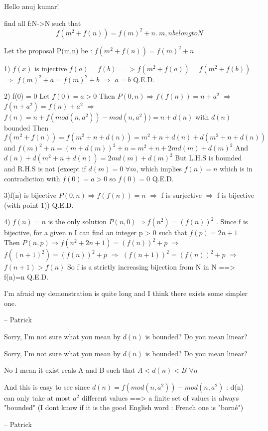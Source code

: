 \begin{mysolution}
	Hello anuj kumar!
\begin{tcolorbox}find all f:N->N such that
\[f(m^{2}+f(n))=f(m)^{2}+n.\ m,n belong to N \]
\end{tcolorbox}

Let the proposal P(m,n) be : $f(m^{2}+f(n))=f(m)^{2}+n$

1) $f(x)$ is injective
$f(a) = f(b)$ ==> $f(m^{2}+f(a))=f(m^{2}+f(b))$ $\Rightarrow$ $f(m)^{2}+a=f(m)^{2}+b$ $\Rightarrow$ $a=b$
Q.E.D.

2) f(0) = 0
Let $f(0)=a > 0$ Then $P(0,n) \Rightarrow f(f(n)) = n+a^{2}$ $\Rightarrow$ $f(n+a^{2}) = f(n)+a^{2}$ $\Rightarrow$ $f(n)=n+f(mod(n,a^{2}))-mod(n,a^{2})) = n+d(n)$ with $d(n)$ bounded
Then $f(m^{2}+f(n))=f(m^{2}+n+d(n))=m^{2}+n+d(n)+d(m^{2}+n+d(n))$ and $f(m)^{2}+n=(m+d(m))^{2}+n=m^{2}+n+2md(m)+d(m)^{2}$
And $d(n)+d(m^{2}+n+d(n))=2md(m)+d(m)^{2}$
But L.H.S is bounded and R.H.S is not (except if $d(m)=0$ $\forall m$, which implies $f(n)=n$ which is in contradiction with $f(0)=a > 0$ 
so $f(0)=0$
Q.E.D.

3)f(n) is bijective
$P(0,n) \Rightarrow f(f(n))=n$ $\Rightarrow$ f is surjective $\Rightarrow$ f is bijective (with point 1))
Q.E.D.

4) $f(n)=n$ is the only solution
$P(n,0) \Rightarrow f(n^{2})=(f(n))^{2}$ .
Since f is bijective, for a given n I can find an integer p > 0 such that $f(p)=2n+1$
Then $P(n,p) \Rightarrow f(n^{2}+2n+1)=(f(n))^{2}+p$ $\Rightarrow$ $f((n+1)^{2})=(f(n))^{2}+p$ $\Rightarrow$ $(f(n+1))^{2}=(f(n))^{2}+p$ $\Rightarrow$ $f(n+1) > f(n)$
So f is a strictly increasing bijection from N in N ==> f(n)=n
Q.E.D.

I'm afraid my demonstration is quite long and I think there exists some simpler one.

-- 
Patrick
\end{mysolution}



\begin{mysolution}
	Sorry, I'm not sure what you mean by $d(n)$ is bounded? Do you mean linear?
\end{mysolution}



\begin{mysolution}
	\begin{tcolorbox}Sorry, I'm not sure what you mean by $d(n)$ is bounded? Do you mean linear?\end{tcolorbox}

No I mean it exist reals A and B such that $A < d(n) < B$ $\forall n$

And this is easy to see since $d(n)=f(mod(n,a^{2}))-mod(n,a^{2})$ : d(n) can only take at most $a^{2}$ different values ==> a finite set of values is always "bounded" (I dont know if it is the good English word : French one is "borné")

-- 
Patrick
\end{mysolution}




